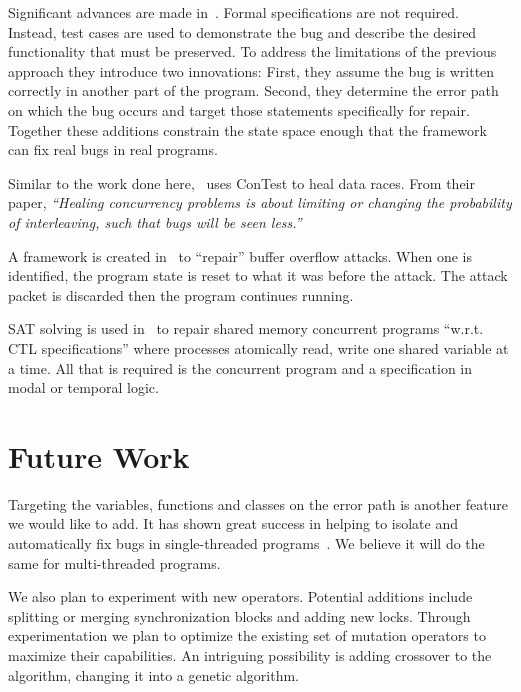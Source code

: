 \documentclass{llncs}
\begin{document}
Significant advances are made in~\cite{FNWG09, WNLF09, NWLF09, WFGN10,
GNFW11}. Formal specifications are not required. Instead, test cases are
used to demonstrate the bug and describe the desired functionality that must be
preserved. To address the limitations of the previous approach they introduce
two innovations: First, they assume the bug is written correctly in another
part of the program. Second, they determine the error path on which the bug
occurs and target those statements specifically for repair. Together these
additions constrain the state space enough that the framework can fix real bugs
in real programs.

Similar to the work done here,~\cite{KLT+07, LVK08} uses ConTest to heal data
races. From their paper, \textit{``Healing concurrency problems is about
limiting or changing the probability of interleaving, such that bugs will be
seen less.''}

A framework is created in~\cite{CB05} to ``repair'' buffer overflow attacks.
When one is identified, the program state is reset to what it was before the
attack. The attack packet is discarded then the program continues running.

SAT solving is used in~\cite{AY07}  to repair shared memory concurrent programs
``w.r.t. CTL specifications'' where processes atomically read, write one shared
variable at a time. All that is required is the concurrent program and a
specification in modal or temporal logic.


\section{Future Work}
\label{sec:future_work}

Targeting the variables, functions and classes on the error path is another
feature we would like to add. It has shown great success in helping to isolate
and automatically fix bugs in single-threaded programs~\cite{FNWG09, NWLF09,
WFGN10, GNFW11}. We believe it will do the same for multi-threaded programs.

We also plan to experiment with new operators. Potential additions include
splitting or merging synchronization blocks and adding new locks. Through
experimentation we plan to optimize the existing set of mutation operators to
maximize their capabilities.  An intriguing possibility is adding crossover to
the algorithm, changing it into a genetic algorithm.
\end{document}
